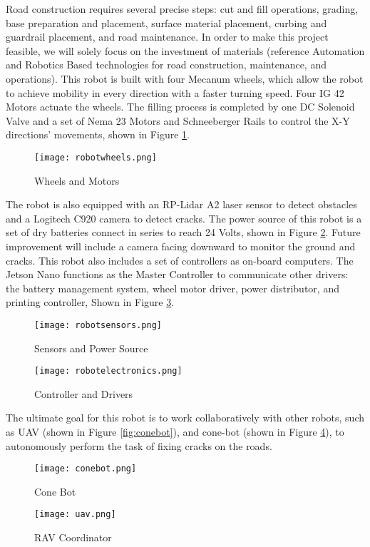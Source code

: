 \documentclass{article}
\begin{document}
Road construction requires several precise steps: cut and fill operations, grading, base preparation and placement, surface material placement, curbing and guardrail placement, and road maintenance. In order to make this project feasible, we will solely focus on the investment of materials (reference Automation and Robotics Based technologies for road construction, maintenance, and operations). This robot is built with four Mecanum wheels, which allow the robot to achieve mobility in every direction with a faster turning speed. Four IG 42 Motors actuate the wheels. The filling process is completed by one DC Solenoid Valve and a set of Nema 23 Motors and Schneeberger Rails to control the X-Y directions’ movements, shown in Figure \ref{fig:wheels}. 
\begin{figure}[htbp]
	\centering
	\texttt{[image: robotwheels.png]}
	\caption{Wheels and Motors}
	\label{fig:wheels}
\end{figure}

The robot is also equipped with an RP-Lidar A2 laser sensor to detect obstacles and a Logitech C920 camera to detect cracks. The power source of this robot is a set of dry batteries connect in series to reach 24 Volts, shown in Figure \ref{fig:sensors}. Future improvement will include a camera facing downward to monitor the ground and cracks. This robot also includes a set of controllers as on-board computers. The Jetson Nano functions as the Master Controller to communicate other drivers: the battery management system, wheel motor driver, power distributor, and printing controller, Shown in Figure \ref{fig:electronics}. \par
\begin{figure}[htbp]
	\centering
	\texttt{[image: robotsensors.png]}
	\caption{Sensors and Power Source}
	\label{fig:sensors}
\end{figure}

\begin{figure}[htbp]
	\centering
	\texttt{[image: robotelectronics.png]}
	\caption{Controller and Drivers}
	\label{fig:electronics}
\end{figure}

The ultimate goal for this robot is to work collaboratively with other robots, such as UAV (shown in Figure \ref{fig:conebot}), and cone-bot (shown in Figure \ref{fig:uav}), to autonomously perform the task of fixing cracks on the roads. 

\begin{figure}[htbp]
\begin{minipage}[htbp]{0.5\linewidth}
\centering
\texttt{[image: conebot.png]}
\caption{Cone Bot}
\label{fig:conebot}
\end{minipage}
\begin{minipage}[htbp]{0.5\linewidth}
\centering
\texttt{[image: uav.png]}
\caption{RAV Coordinator}
\label{fig:uav}
\end{minipage}
\end{figure}
\end{document}
